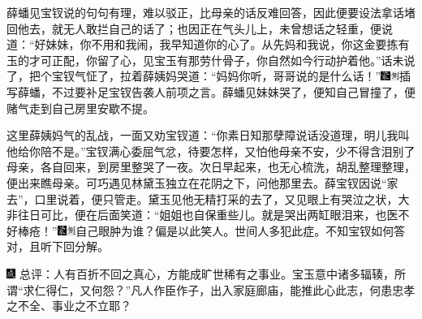 薛蟠见宝钗说的句句有理，难以驳正，比母亲的话反难回答，因此便要设法拿话堵回他去，就无人敢拦自己的话了；也因正在气头儿上，未曾想话之轻重，便说道：“好妹妹，你不用和我闹，我早知道你的心了。从先妈和我说，你这金要拣有玉的才可正配，你留了心，见宝玉有那劳什骨子，你自然如今行动护着他。”话未说了，把个宝钗气怔了，拉着薛姨妈哭道：“妈妈你听，哥哥说的是什么话！”{\includegraphics[width=3mm]{../Images/00006}\includegraphics[width=3mm]{../Images/00011}\footnotesize \kaishu 插写薛蟠，不过要补足宝钗告袭人前项之言。}薛蟠见妹妹哭了，便知自己冒撞了，便赌气走到自己房里安歇不提。

这里薛姨妈气的乱战，一面又劝宝钗道：“你素日知那孽障说话没道理，明儿我叫他给你陪不是。”宝钗满心委屈气忿，待要怎样，又怕他母亲不安，少不得含泪别了母亲，各自回来，到房里整哭了一夜。次日早起来，也无心梳洗，胡乱整理整理，便出来瞧母亲。可巧遇见林黛玉独立在花阴之下，问他那里去。薛宝钗因说“家去”，口里说着，便只管走。黛玉见他无精打采的去了，又见眼上有哭泣之状，大非往日可比，便在后面笑道：“姐姐也自保重些儿。就是哭出两缸眼泪来，也医不好棒疮！”{\includegraphics[width=3mm]{../Images/00006}\includegraphics[width=3mm]{../Images/00011}\footnotesize \kaishu 自己眼肿为谁？偏是以此笑人。世间人多犯此症。}不知宝钗如何答对，且听下回分解。

{\includegraphics[width=3mm]{../Images/00005}  \kaishu 总评：人有百折不回之真心，方能成旷世稀有之事业。宝玉意中诸多辐辏，所谓“求仁得仁，又何怨？”凡人作臣作子，出入家庭廊庙，能推此心此志，何患忠孝之不全、事业之不立耶？}


